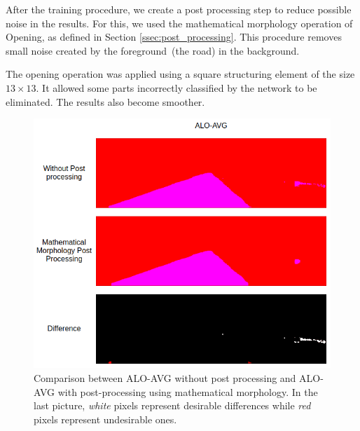 After the training procedure, we create a post processing step to reduce possible noise in the results. For this, we used the mathematical morphology operation of Opening, as defined in Section \ref{ssec:post_processing}. This procedure removes small noise created by the foreground~(the road) in the background. 

The opening operation was applied using a square structuring element of the size $13\times13$. It allowed some parts incorrectly classified by the network to be eliminated. The results also become smoother.



\begin{figure}[h]
  \centering
  \includegraphics[width=1.\columnwidth]{figures/falreis/post_processing_comparison.png}
  \caption{Comparison between ALO-AVG without post processing and ALO-AVG with post-processing using mathematical morphology. In the last picture, \textit{white} pixels represent desirable differences while \textit{red} pixels represent undesirable ones.}
  \label{fig:post_processing_comp}
\end{figure}

